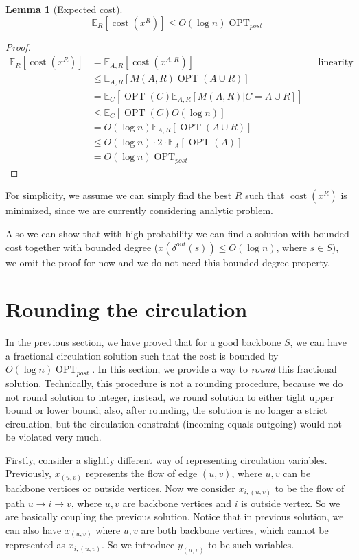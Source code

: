 \documentclass[11pt]{article}
\newtheorem{lemma}{Lemma}
\DeclareMathOperator{\OPT}{OPT}
\newcommand{\E}{\mathbb{E}}
\newcommand{\1}{\mathbf{1}}
\newcommand{\cost}{\operatorname{cost}}
\begin{document}
\begin{lemma}[Expected cost]
\[
    \E_{R} [\cost(x^R)] \le O(\log n) \OPT_{post}
\]
\end{lemma}
\begin{proof}
    \begin{align*}
        \E_{R} [\cost(x^R)] &= \E_{A,R} [\cost(x^{A,R})] && \text{linearity of cost} \\
                            &\le \E_{A,R} [M(A,R) \OPT(A \cup R)] \\ 
                            &= \E_C[\OPT(C) \E_{A,R}[M(A,R) | C = A \cup R]] \\
                            &\le \E_C[\OPT(C) O(\log n)] \\
                            &= O(\log n) \E_{A,R}[\OPT(A \cup R)] \\ 
                            &\le O(\log n) \cdot 2 \cdot \E_A[\OPT(A)] \\ 
                            &= O(\log n) \OPT_{post}
    \end{align*}
\end{proof}

For simplicity, we assume we can simply find the best $R$ such that $\cost(x^R)$ 
is minimized, since we are currently considering analytic problem.

Also we can show that with high probability we can find a solution with bounded 
cost together with bounded degree ($x(\delta^{out}(s)) \le O(\log n)$, where $s \in S$),
we omit the proof for now and we do not need this bounded degree property.

\section{Rounding the circulation}
In the previous section, we have proved that for a good backbone $S$, we can 
have a fractional circulation solution such that the cost is bounded by $O(\log n) \OPT_{post}$.
In this section, we provide a way to \emph{round} this fractional solution. 
Technically, this procedure is not a rounding procedure, because we do not round 
solution to integer, instead, we round solution to either tight upper bound or 
lower bound; also, after rounding, the solution is no longer a strict circulation,
but the circulation constraint (incoming equals outgoing) would not be violated 
very much.

Firstly, consider a slightly different way of representing circulation variables.
Previously, $x_{(u,v)}$ represents the flow of edge $(u,v)$, where $u, v$ can be 
backbone vertices or outside vertices. Now we consider $x_{i,(u,v)}$ to be the flow 
of path $u \rightarrow i \rightarrow v$, where $u, v$ are backbone vertices and $i$
is outside vertex. So we are basically coupling the previous solution. 
Notice that in previous solution, we can also have $x_{(u,v)}$ where $u, v$ are 
both backbone vertices, which cannot be represented as $x_{i, (u,v)}$. So we introduce
$y_{(u,v)}$ to be such variables.
\end{document}
